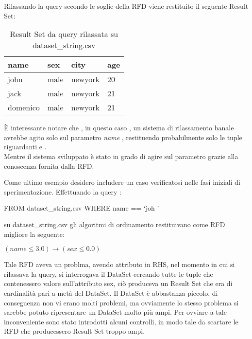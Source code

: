 Rilassando la query secondo le soglie della RFD viene restituito il seguente Result Set:
\begin{table}[H]
    \centering
    \begin{tabular}{|l |l |l |l |}
    \hline
    name & sex & city & age \\
    \hline
    john & male & newyork &  20 \\
    jack & male & newyork &  21 \\
    domenico & male & newyork &  21\\
    \hline
    \end{tabular}
    \caption{Result Set da query rilassata su dataset{\_}string.csv }
    \label{tab:ds_rx_query_ds_str}
\end{table}

È interessante notare che , in questo caso , un sistema di rilassamento banale avrebbe agito solo sul parametro \textit{name} , restituendo probabilmente solo le tuple riguardanti  e . \\
Mentre il sistema sviluppato è stato in grado di agire sul parametro  grazie alla conoscenza fornita dalla RFD.

Come ultimo esempio desidero includere un caso verificatosi nelle fasi iniziali di sperimentazione. Effettuando la query :
\begin{center}
FROM dataset{\_}string.csv WHERE name == \lq joh \rq
\end{center}
su dataset{\_}string.csv gli algoritmi di ordinamento restituivano come RFD migliore la seguente:
\begin{center}
    $(name \leq 3.0)  \rightarrow (sex \leq 0.0)$
\end{center}

Tale RFD aveva un problma, avendo attributo  in RHS, nel momento in cui si rilassava la query, si interrogava il DataSet cercando tutte le tuple che contenessero valore  sull'attributo sex, ciò produceva un Result Set che era di cardinalità pari a metà del DataSet. Il DataSet è abbastanza piccolo, di conseguenza non vi erano molti problemi, ma ovviamente lo stesso problema si sarebbe potuto ripresentare un DataSet molto più ampi. Per ovviare a tale inconveniente sono stato introdotti alcuni controlli, in modo tale da scartare le RFD che producessero Result Set troppo ampi.


